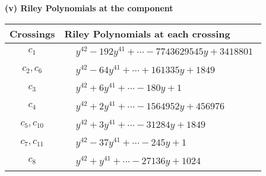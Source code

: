 \documentclass[1p]{elsarticle_modified}
\theoremstyle{definition}
\begin{document}
\newpage\renewcommand{\arraystretch}{1}
\flushleft \textbf{(v) Riley Polynomials at the component}\newline \\
\begin{tabular}{m{50pt}|m{274pt}}
Crossings & \hspace{64pt}Riley Polynomials at each crossing \\
\hline $$\begin{aligned}c_{1}\end{aligned}$$&$\begin{aligned}
&y^{42}-192 y^{41}+\cdots-7743629545 y+3418801
\end{aligned}$\\
\hline $$\begin{aligned}c_{2},c_{6}\end{aligned}$$&$\begin{aligned}
&y^{42}-64 y^{41}+\cdots+161335 y+1849
\end{aligned}$\\
\hline $$\begin{aligned}c_{3}\end{aligned}$$&$\begin{aligned}
&y^{42}+6 y^{41}+\cdots-180 y+1
\end{aligned}$\\
\hline $$\begin{aligned}c_{4}\end{aligned}$$&$\begin{aligned}
&y^{42}+2 y^{41}+\cdots-1564952 y+456976
\end{aligned}$\\
\hline $$\begin{aligned}c_{5},c_{10}\end{aligned}$$&$\begin{aligned}
&y^{42}+3 y^{41}+\cdots-31284 y+1849
\end{aligned}$\\
\hline $$\begin{aligned}c_{7},c_{11}\end{aligned}$$&$\begin{aligned}
&y^{42}-37 y^{41}+\cdots-245 y+1
\end{aligned}$\\
\hline $$\begin{aligned}c_{8}\end{aligned}$$&$\begin{aligned}
&y^{42}+y^{41}+\cdots-27136 y+1024
\end{aligned}$\\

\end{tabular}
\end{document}
